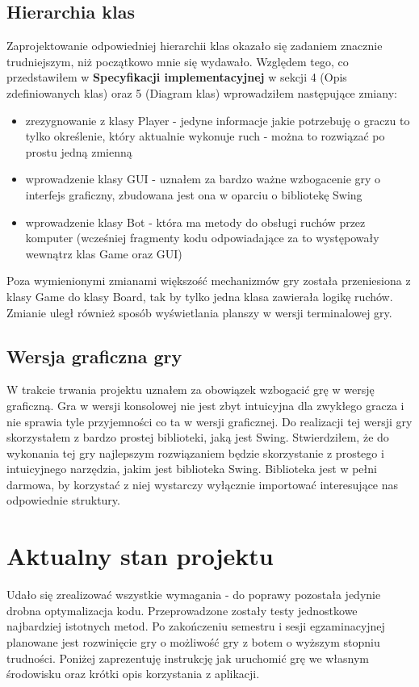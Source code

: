 \documentclass{article}
\begin{document}
\subsection{Hierarchia klas}
Zaprojektowanie odpowiedniej hierarchii klas okazało się zadaniem znacznie trudniejszym, niż początkowo mnie się wydawało. Względem tego, co przedstawiłem w \textbf{Specyfikacji implementacyjnej} w sekcji 4 (Opis zdefiniowanych klas) oraz 5 (Diagram klas) wprowadziłem następujące zmiany:
\begin{itemize}
    \item zrezygnowanie z klasy Player - jedyne informacje jakie potrzebuję o graczu to tylko określenie, który aktualnie wykonuje ruch - można to rozwiązać po prostu jedną zmienną
    \item wprowadzenie klasy GUI - uznałem za bardzo ważne wzbogacenie gry o interfejs graficzny, zbudowana jest ona w oparciu o bibliotekę Swing
    \item wprowadzenie klasy Bot - która ma metody do obsługi ruchów przez komputer (wcześniej fragmenty kodu odpowiadające za to występowały wewnątrz klas Game oraz GUI)
\end{itemize}    
Poza wymienionymi zmianami większość mechanizmów gry została przeniesiona z klasy Game do klasy Board, tak by tylko jedna klasa zawierała logikę ruchów. Zmianie uległ również sposób wyświetlania planszy w wersji terminalowej gry.

\subsection{Wersja graficzna gry}
W trakcie trwania projektu uznałem za obowiązek wzbogacić grę w wersję graficzną. Gra w wersji konsolowej nie jest zbyt intuicyjna dla zwykłego gracza i nie sprawia tyle przyjemności co ta w wersji graficznej. Do realizacji tej wersji gry skorzystałem z bardzo prostej biblioteki, jaką jest Swing. Stwierdziłem, że do wykonania tej gry najlepszym rozwiązaniem będzie skorzystanie z prostego i intuicyjnego narzędzia, jakim jest biblioteka Swing. Biblioteka jest w pełni darmowa, by korzystać z niej wystarczy wyłącznie importować interesujące nas odpowiednie struktury.

\section{Aktualny stan projektu}
Udało się zrealizować wszystkie wymagania - do poprawy pozostała jedynie drobna optymalizacja kodu. Przeprowadzone zostały testy jednostkowe najbardziej istotnych metod. Po zakończeniu semestru i sesji egzaminacyjnej planowane jest rozwinięcie gry o możliwość gry z botem o wyższym stopniu trudności. Poniżej zaprezentuję instrukcję jak uruchomić grę we własnym środowisku oraz krótki opis korzystania z aplikacji.
\end{document}
